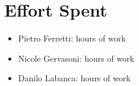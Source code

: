 \documentclass[english]{article}
\begin{document}
\section{Effort Spent}
\begin{itemize}
	\item{Pietro Ferretti:  hours of work}
	\item{Nicole Gervasoni:  hours of work}
	\item{Danilo Labanca:  hours of work}
\end{itemize}
\end{document}
